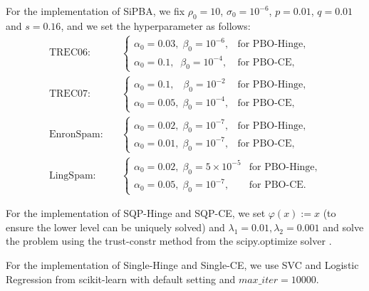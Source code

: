 \documentclass{article}
\def\x{x}
\begin{document}
    For the implementation of SiPBA, we fix $\rho_0=10$, $\sigma_0=10^{-6}$, $p=0.01$, $q=0.01$ and $s=0.16$, and we set the hyperparameter as follows:
\begin{align*}
\text{TREC06:} &\quad 
\begin{cases} 
\alpha_0 = 0.03,\; \beta_0 = 10^{-6}, & \text{for PBO-Hinge}, \\
\alpha_0 = 0.1,\;\; \beta_0 = 10^{-4}, & \text{for PBO-CE},
\end{cases} \\
\text{TREC07:} &\quad 
\begin{cases} 
\alpha_0 = 0.1, \;\;\;\beta_0 = 10^{-2}& \text{for PBO-Hinge}, \\
\alpha_0 = 0.05, \;\beta_0 = 10^{-4},& \text{for PBO-CE},
\end{cases} \\
\text{EnronSpam:} &\quad 
\begin{cases} 
\alpha_0 = 0.02,\; \beta_0 = 10^{-7}, & \text{for PBO-Hinge}, \\
\alpha_0 = 0.01,\; \beta_0 = 10^{-7}, & \text{for PBO-CE},
\end{cases} \\
\text{LingSpam:} &\quad 
\begin{cases} 
\alpha_0 = 0.02,\; \beta_0 = 5 \times 10^{-5} & \text{for PBO-Hinge}, \\
\alpha_0 = 0.05, \;\beta_0 = 10^{-7},& \text{for PBO-CE}.
\end{cases}
\end{align*}

    
    
    For the implementation of SQP-Hinge and SQP-CE, we set $\varphi(x) := \x$ (to ensure the lower level can be uniquely solved) and $\lambda_1=0.01,\lambda_2=0.001$ and solve the problem using the trust-constr method from the scipy.optimize solver \cite{virtanen2020scipy}.

     For the implementation of  Single-Hinge and Single-CE, we use SVC and Logistic Regression from scikit-learn \cite{pedregosa2011scikit} with default setting and $max\_iter=10000$. 
\end{document}
